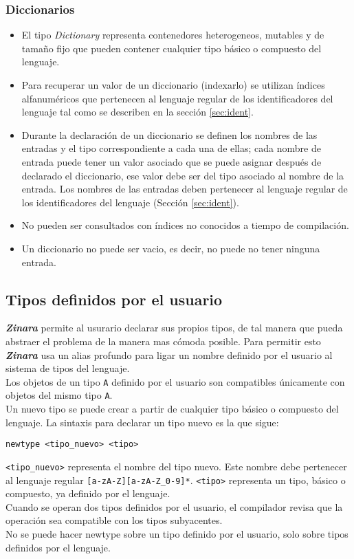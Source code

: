 \documentclass[12pt, spanish]{report}
\begin{document}
\subsubsection{Diccionarios}
\label{sec:dics}
\begin{itemize}
\item El tipo \emph{Dictionary} representa contenedores heterogeneos,
  mutables y de tama\~no fijo que pueden contener cualquier tipo
  b\'asico o compuesto del lenguaje.
\item Para recuperar un valor de un diccionario (indexarlo) se
  utilizan \'indices alfanum\'ericos que pertenecen al lenguaje
  regular de los identificadores del lenguaje tal como se describen en
  la secci\'on \ref{sec:ident}.
\item Durante la declaraci\'on de un diccionario se definen los
  nombres de las entradas y el tipo correspondiente a cada una de
  ellas; cada nombre de entrada puede tener un valor asociado que se
  puede asignar despu\'es de declarado el diccionario, ese valor debe
  ser del tipo asociado al nombre de la entrada. Los nombres de las
  entradas deben pertenecer al lenguaje regular de los identificadores
  del lenguaje (Secci\'on \ref{sec:ident}).
\item No pueden ser consultados con \'indices no conocidos a tiempo de
  compilaci\'on.
\item Un diccionario no puede ser vacio, es decir, no puede no tener
  ninguna entrada.
\end{itemize}

\subsection{Tipos definidos por el usuario}
\label{sec:tiposusuario}
\emph{\textbf{Zinara}} permite al usurario declarar sus propios tipos,
de tal manera que pueda abstraer el problema de la manera mas c\'omoda
posible. Para permitir esto \emph{\textbf{Zinara}} usa un alias profundo
para ligar un nombre definido por el usuario al sistema de tipos del
lenguaje.\\
\indent Los objetos de un tipo \texttt{A} definido por el usuario son
compatibles \'unicamente con objetos del mismo tipo \texttt{A}.\\
\indent Un nuevo tipo se puede crear a partir de cualquier tipo b\'asico
o compuesto del lenguaje. La sintaxis para declarar un tipo nuevo es la
que sigue:
\begin{verbatim}
newtype <tipo_nuevo> <tipo>
\end{verbatim}
\texttt{\textless tipo\_nuevo\textgreater} representa el nombre del tipo
nuevo. Este nombre debe pertenecer al lenguaje regular
\texttt{[a-zA-Z][a-zA-Z\_0-9]*}. \texttt{\textless tipo\textgreater} representa un
tipo, b\'asico o compuesto, ya definido por el lenguaje.\\
Cuando se operan dos tipos definidos por el usuario, el compilador
revisa que la operaci\'on sea compatible con los tipos subyacentes.\\
No se puede hacer newtype sobre un tipo definido por el usuario, solo
sobre tipos definidos por el lenguaje.
\end{document}
